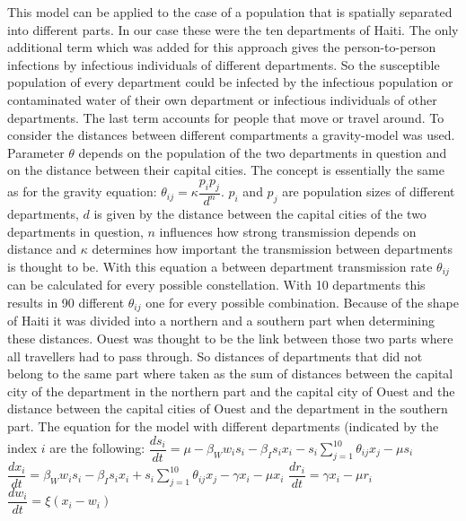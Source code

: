 \documentclass[11pt]{article}
\begin{document}
This model can be applied to the case of a population  that is spatially separated into different parts. In our case these were the ten departments of Haiti. The only additional term which was added for this approach gives the person-to-person infections by infectious individuals of different departments. So the susceptible population of every department could be infected by the infectious population or contaminated water of their own department or infectious individuals of other departments. The last term accounts for people that move or travel around. To consider the distances between different compartments a gravity-model was used. Parameter $ \theta $ depends on the population of the two departments in question and on the distance between their capital cities. The concept is essentially the same as for the gravity equation: $ \theta_{ij}=\kappa\dfrac{p_{i}p_{j}}{d^{n}} $. $ p_{i} $ and $ p_{j} $ are population sizes of different departments, $ d $ is given by the distance between the capital cities of the two departments in question, $ n $ influences how strong transmission depends on distance and $ \kappa $ determines how important the transmission between departments is thought to be. With this equation a between department transmission rate $ \theta_{ij} $ can be calculated for every possible constellation. With 10 departments this results in 90 different $ \theta_{ij} $ one for every possible combination. Because of the shape of Haiti it was divided into a northern and a southern part when determining these distances. Ouest was thought to be the link between those two parts where all travellers had to pass through. So distances of departments that did not belong to the same part where taken as the sum of distances between the capital city of the department in the northern part and the capital city of Ouest and the distance between the capital cities of Ouest and the department in the southern part.
The equation for the model with different departments (indicated by the index $ i $ are the following:
\linebreak
$ \dfrac{ds_{i}}{dt}=\mu -\beta_{W}w_{i}s_{i}-\beta_{I}s_{i}x_{i}-s_{i}\sum_{j=1}^{10}\theta_{ij}x_{j}-\mu s_{i} $
\linebreak
$ \dfrac{dx_{i}}{dt}=\beta_{W}w_{i}s_{i}-\beta_{I}s_{i}x_{i}+s_{i}\sum_{j=1}^{10}\theta_{ij}x_{j}
-\gamma x_{i}-\mu x_{i} $
\linebreak
$ \dfrac{dr_{i}}{dt}=\gamma x_{i}-\mu r_{i} $
\linebreak
$ \dfrac{dw_{i}}{dt}=\xi (x_{i}-w_{i}) $
\linebreak
\end{document}
